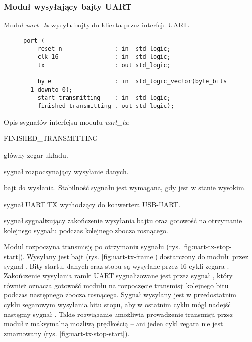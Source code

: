 \newpage
\subsubsection{Moduł wysyłający bajty UART}
Moduł \textit{uart\_tx} wysyła bajty do klienta przez interfejs UART.

\begin{figure}[!h]
\begin{lstlisting}[style=vhdl, captionpos=b, caption={\textit{uart\_tx} -- interfejs modułu}]
port (
	reset_n               : in  std_logic;
	clk_16                : in  std_logic;
	tx                    : out std_logic;

	byte                  : in  std_logic_vector(byte_bits - 1 downto 0);
	start_transmitting    : in  std_logic;
	finished_transmitting : out std_logic);
\end{lstlisting}
\end{figure}

Opis sygnałów interfejsu modułu \textit{uart\_tx}:
\begin{interface}{FINISHED\_TRANSMITTING}
\item[\insignal{CLK\_16}] główny zegar układu.
\item[\insignal{START\_TRANSMITTING}] sygnał rozpoczynający wysyłanie danych.
\item[\insignal{BYTE[7:0]}] bajt do wysłania. Stabilność sygnału jest wymagana, gdy  jest w stanie wysokim.
\item[\outsignal{TX}] sygnał UART TX wychodzący do konwertera USB-UART.
\item[\outsignal{FINISHED\_TRANSMITTING}] sygnał sygnalizujący zakończenie wysyłania bajtu oraz gotowość na otrzymanie kolejnego sygnału  podczas kolejnego zbocza rosnącego.
\end{interface}

Moduł rozpoczyna transmisję po otrzymaniu sygnału  (rys. \ref{fig:uart-tx-stop-start}). Wysyłany jest bajt (rys. \ref{fig:uart-tx-frame}) dostarczony do modułu przez sygnał . Bity startu, danych oraz stopu są wysyłane przez 16 cykli zegara . Zakończenie wysyłania ramki UART sygnalizowane jest przez sygnał , który również oznacza gotowość modułu na rozpoczęcie transmisji kolejnego bitu podczas następnego zbocza rosnącego. Sygnał  wysyłany jest w przedostatnim cyklu zegarowym wysyłania bitu stopu, aby w ostatnim cyklu mógł nadejść następny sygnał . Takie rozwiązanie umożliwia prowadzenie transmisji przez moduł z maksymalną możliwą prędkością -- ani jeden cykl zegara nie jest zmarnowany (rys. \ref{fig:uart-tx-stop-start}).

